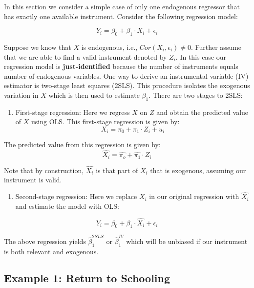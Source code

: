 \documentclass[
]{book}
\providecommand{\tightlist}{%
  \setlength{\itemsep}{0pt}\setlength{\parskip}{0pt}}
\theoremstyle{definition}
\theoremstyle{definition}
\theoremstyle{definition}
\theoremstyle{definition}
\theoremstyle{remark}
\begin{document}
In this section we consider a simple case of only one endogenous regressor that has exactly one available instrument. Consider the following regression model:

\[Y_i=\beta_0+\beta_1\cdot X_i +\epsilon_i\]

Suppose we know that \(X\) is endogenous, i.e., \(Cor(X_i,\epsilon_i)\neq 0\). Further assume that we are able to find a valid instrument denoted by \(Z_i\). In this case our regression model is \textbf{just-identified} because the number of instruments equals number of endogenous variables. One way to derive an instrumental variable (IV) estimator is two-stage least squares (2SLS). This procedure isolates the exogenous variation in \(X\) which is then used to estimate \(\beta_1\). There are two stages to 2SLS:

\begin{enumerate}
\def\labelenumi{\arabic{enumi}.}
\tightlist
\item
  First-stage regression: Here we regress \(X\) on \(Z\) and obtain the predicted value of \(X\) using OLS. This first-stage regression is given by:
  \[X_i=\pi_0+\pi_1 \cdot Z_i+u_i\]
\end{enumerate}

The predicted value from this regression is given by:
\[\widehat{X_i}=\widehat{\pi_o}+\widehat{\pi_1}\cdot Z_i\]

Note that by construction, \(\widehat{X_i}\) is that part of \(X_i\) that is exogenous, assuming our instrument is valid.

\begin{enumerate}
\def\labelenumi{\arabic{enumi}.}
\setcounter{enumi}{1}
\tightlist
\item
  Second-stage regression: Here we replace \(X_i\) in our original regression with \(\widehat{X_i}\) and estimate the model with OLS:
\end{enumerate}

\[Y_i=\beta_0+\beta_1\cdot \widehat{X_i} +\epsilon_i\]

The above regression yields \(\widehat{\beta}_{1}^{2SLS}\) or \(\widehat{\beta}_{1}^{IV}\) which will be unbiased if our instrument is both relevant and exogenous.

\hypertarget{example-1-return-to-schooling}{%
\subsection{Example 1: Return to Schooling}\label{example-1-return-to-schooling}}
\end{document}
